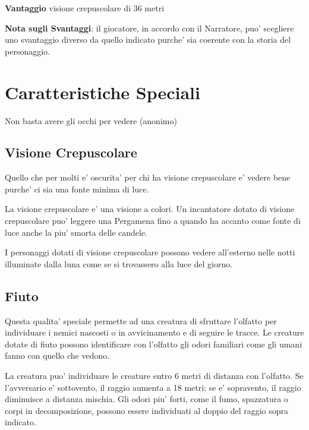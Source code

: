 \documentclass[a4paper,11pt,twoside,openany]{dndbook}
\begin{document}
\textbf{Vantaggio} visione crepuscolare di 36 metri

\bigskip

\textbf{Nota sugli Svantaggi}: il giocatore, in accordo con il Narratore, puo' scegliere uno svantaggio diverso da quello indicato purche' sia coerente con la storia del personaggio.


\pagebreak

\section{Caratteristiche Speciali}

\label{caratteristiche-speciali}
\begin{quotebox}Non basta avere gli occhi per vedere (anonimo)
\end{quotebox}

\subsection{Visione Crepuscolare}

Quello che per molti e’ oscurita’ per chi ha visione crepuscolare e’ vedere bene purche’ ci sia una fonte minima di luce.

La visione crepuscolare e' una visione a colori.
Un incantatore dotato di visione crepuscolare puo' leggere una Pergamena fino a quando ha accanto come fonte di luce anche la piu' smorta delle candele.

I personaggi dotati di visione crepuscolare possono vedere all’esterno nelle notti illuminate dalla luna come se si trovassero alla luce del giorno.

\subsection{Fiuto}

Questa qualita’ speciale permette ad una creatura di sfruttare l'olfatto per individuare i nemici nascosti o in avvicinamento e di seguire le tracce. Le creature dotate di fiuto possono identificare con l'olfatto gli odori familiari come gli umani fanno con quello che vedono.

La creatura puo' individuare le creature entro 6 metri di distanza con l'olfatto. Se l'avversario e' sottovento, il raggio aumenta a 18 metri; se e' sopravento, il raggio diminuisce a distanza mischia.
Gli odori piu' forti, come il fumo, spazzatura o corpi in decomposizione, possono essere individuati al doppio del raggio sopra indicato.
\end{document}
